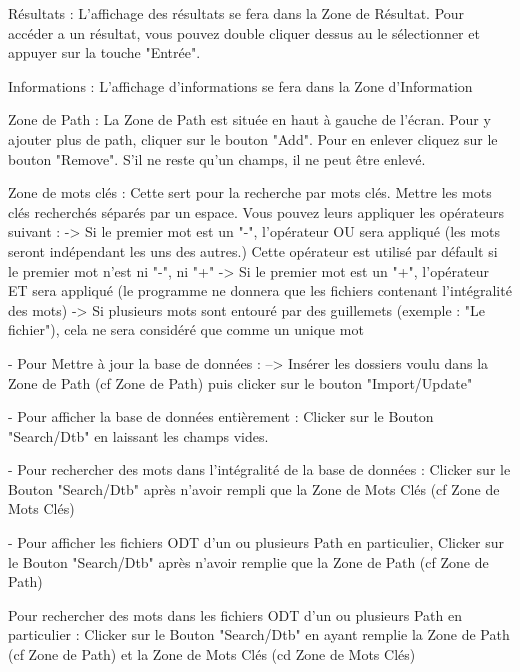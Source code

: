 Résultats : L'affichage des résultats se fera dans la Zone de Résultat. 
Pour accéder a un résultat, vous pouvez double cliquer dessus au le sélectionner et appuyer sur la touche "Entrée".

Informations : L'affichage d'informations se fera dans la Zone d'Information

Zone de Path : La Zone de Path est située en haut à gauche de l'écran. Pour y ajouter plus de path, cliquer sur le bouton "Add". Pour en enlever cliquez sur le bouton "Remove". 
S'il ne reste qu'un champs, il ne peut être enlevé.

Zone de mots clés : Cette sert pour la recherche par mots clés. Mettre les mots clés recherchés séparés par un espace. Vous pouvez leurs appliquer les opérateurs suivant :
-> Si le premier mot est un "-", l'opérateur OU sera appliqué (les mots seront indépendant les uns des autres.)
Cette opérateur est utilisé par défault si le premier mot n'est ni "-", ni "+"
-> Si le premier mot est un "+", l'opérateur ET sera appliqué (le programme ne donnera que les fichiers contenant l'intégralité des mots)
-> Si plusieurs mots sont entouré par des guillemets (exemple : "Le fichier"), cela ne sera considéré que comme un unique mot

- Pour Mettre à jour la base de données :
--> Insérer les dossiers voulu dans la Zone de Path (cf Zone de Path) puis clicker sur le bouton "Import/Update"

- Pour afficher la base de données entièrement : Clicker sur le Bouton "Search/Dtb" en laissant les champs vides.

- Pour rechercher des mots dans l'intégralité de la base de données : Clicker sur le Bouton "Search/Dtb" après n'avoir rempli que la Zone de Mots Clés (cf Zone de Mots Clés)

- Pour afficher les fichiers ODT d'un ou plusieurs Path en particulier, Clicker sur le Bouton "Search/Dtb" après n'avoir remplie que la Zone de Path (cf Zone de Path)

Pour rechercher des mots dans les fichiers ODT d'un ou plusieurs Path en particulier : Clicker sur le Bouton "Search/Dtb" en ayant remplie la Zone de Path (cf Zone de Path) et la Zone de Mots Clés (cd Zone de Mots Clés)
